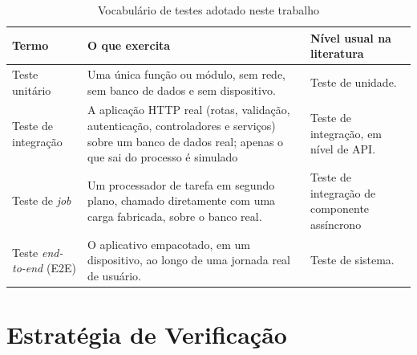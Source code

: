 \begin{table}[H]
\centering
\caption{Vocabulário de testes adotado neste trabalho}
\label{tab:test-vocab}
\small
\begin{tabular}{|p{2.8cm}|p{6.6cm}|p{4.2cm}|}
\hline
\textbf{Termo} &
\textbf{O que exercita} &
\textbf{Nível usual na literatura} \\

\hline

Teste unitário &
Uma única função ou módulo, sem rede, sem banco de dados e sem dispositivo. &
Teste de unidade. \\

\hline

Teste de integração &
A aplicação HTTP real (rotas, validação, autenticação, controladores
e serviços) sobre um banco de dados real; apenas o que sai do processo
é simulado &
Teste de integração, em nível de API. \\

\hline

Teste de \textit{job} &
Um processador de tarefa em segundo plano, chamado diretamente com uma carga
fabricada, sobre o banco real. &
Teste de integração de componente assíncrono \\

\hline

Teste \textit{end-to-end} (E2E) &
O aplicativo empacotado, em um dispositivo, ao longo de uma jornada real de
usuário. &
Teste de sistema. \\

\hline
\end{tabular}
\end{table}

\section{Estratégia de Verificação}\label{sec:test-strategy}

